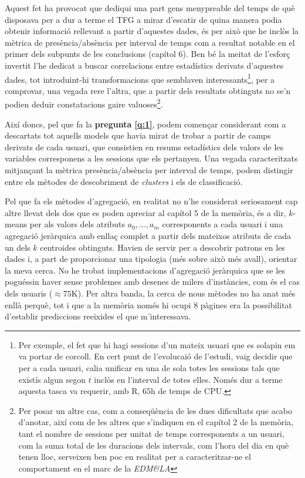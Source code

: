 \documentclass[
	a4paper,
	twoside,
	justified
]{tufte-handout}
\begin{document}
Aquest fet ha provocat que dediqui una part gens menypreable del temps de què disposava per a dur a terme el TFG a mirar d'escatir de quina manera podia obtenir informació rellevant a partir d'aquestes dades, és per això que he inclòs la mètrica de presència/absència per interval de temps com a resultat notable en el primer dels subpunts de les conclusions (capítol 6). Ben bé la meitat de l'esforç invertit l'he dedicat a buscar correlacions entre estadístics derivats d'aquestes dades, tot introduint-hi transformacions que semblaven interessants\footnote[][-5\baselineskip]{Per exemple, el fet que hi hagi sessions d'un mateix usuari que es solapin em va portar de corcoll. En cert punt de l'evolucaió de l'estudi, vaig decidir que per a cada usuari, calia unificar en una de sola totes les sessions tals que existís algun segon $t$ inclòs en l'interval  de totes elles. Només dur a terme aquesta tasca va requerir, amb R, $65\text{h}$ de temps de CPU.}, per a comprovar, una vegada rere l'altra, que a partir dels resultats obtinguts no se'n podien deduir constatacions gaire valuoses\footnote[][\baselineskip]{Per posar un altre cas, com a conseqüència de les dues dificultats que acabo d'anotar, així com de les altres que s'indiquen en el capítol 2 de la memòria, tant el nombre de sessions per unitat de temps corresponents a un usuari, com la suma total de les duracions dels intervals, com l'hora del dia en què tenen lloc, serveixen ben poc en realitat per a caracteritzar-ne el comportament en el marc de la \emph{EDM\&LA}}.

Així doncs, pel que fa la \textbf{pregunta \ref{q:1}}, podem començar considerant com a descartats tot aquells models que havia mirat de trobar a partir de camps derivats de cada usuari, que consistien en resums estadístics dels valors de les variables corresponens a les sessions que els pertanyen. Una vegada caracteritzats mitjançant la mètrica presència/absència per interval de temps, podem distingir entre els mètodes de descobriment de \emph{clusters} i els de classificació.     

Pel que fa els mètodes d'agregació, en realitat no n'he considerat seriosament cap altre llevat dels dos que es poden apreciar al capítol 5 de la memòria, és a dir, $k$-means per als valors dels atributs $a_0, \ldots, a_m$ corresponents a cada usuari i una agregació jeràrquica amb enllaç complet a partir dels mateixos atributs de cada un dels $k$ centroides obtinguts. Havien de servir per a descobrir patrons en les dades i, a part de proporcionar una tipologia (més sobre això més avall), orientar la meva cerca. No he trobat implementacions d'agregació jeràrquica que se les poguéssin haver sense problemes amb desenes de milers d'instàncies, com és el cas dels usuaris ($\approx 75\text{K}$). Per altra banda, la cerca de nous mètodes no ha anat més enllà perquè, tot i que a la memòria només hi ocupi 8 pàgines era la possibilitat d'establir prediccions reeixides el que m'interessava. 
\end{document}
